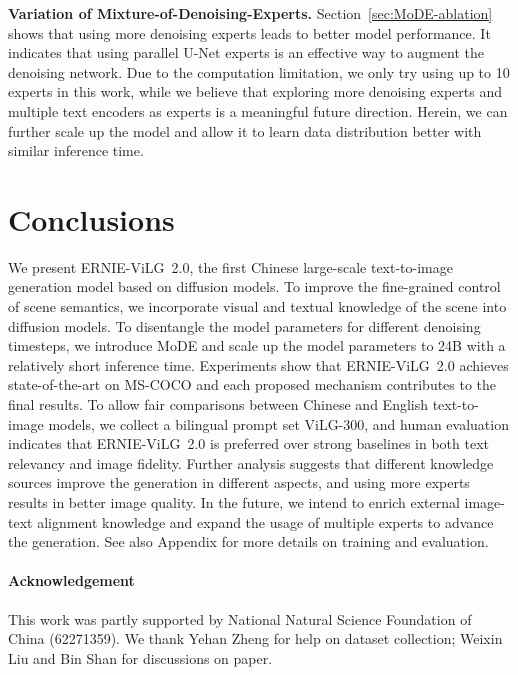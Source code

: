 \documentclass[10pt,twocolumn,letterpaper]{article}
\begin{document}
\noindent\textbf{Variation of Mixture-of-Denoising-Experts.}
Section~\ref{sec:MoDE-ablation} shows that using more denoising experts leads to better model performance. It indicates that using parallel U-Net experts is an effective way to augment the denoising network. Due to the computation limitation, we only try using up to 10 experts in this work, while we believe that exploring more denoising experts and multiple text encoders as experts is a meaningful future direction. 
Herein, we can further scale up the model and allow it to learn data distribution better with similar inference time.


\section{Conclusions}
We present ERNIE-ViLG~2.0, the first Chinese large-scale text-to-image generation model based on diffusion models.
To improve the fine-grained control of scene semantics, we incorporate visual and textual knowledge of the scene into diffusion models. To disentangle the model parameters for different denoising timesteps, we introduce MoDE and scale up the model parameters to 24B with a relatively short inference time.
Experiments show that ERNIE-ViLG~2.0 achieves state-of-the-art on MS-COCO and each proposed mechanism contributes to the final results.
To allow fair comparisons between Chinese and English text-to-image models, we collect a bilingual prompt set ViLG-300, and human evaluation indicates that ERNIE-ViLG~2.0 is preferred over strong baselines in both text relevancy and image fidelity.
Further analysis suggests that different knowledge sources improve the generation in different aspects, and using more experts results in better image quality.
In the future, we intend to enrich external image-text alignment knowledge and expand the usage of multiple experts to advance the generation.
See also Appendix for more details on training and evaluation.

\paragraph{Acknowledgement}
This work was partly supported by National Natural Science Foundation of China (62271359).
We thank Yehan Zheng for help on dataset collection; Weixin Liu and Bin Shan for discussions on paper.



{\small


}
\end{document}
